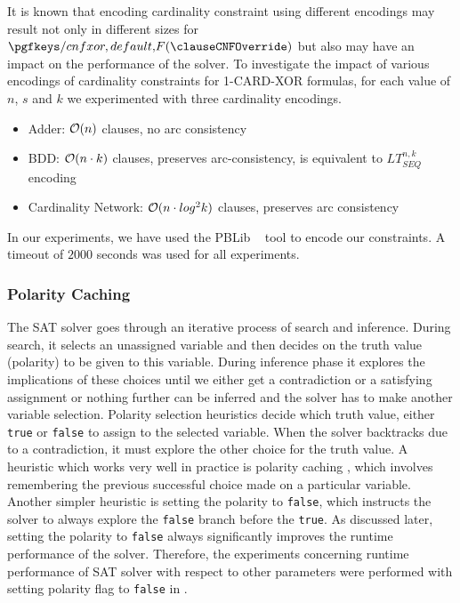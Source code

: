 It is known that encoding cardinality constraint using different encodings may result not only in different sizes for $\F$ but also may have an impact on the performance of the solver.
To investigate the impact of various encodings of cardinality constraints for 1-CARD-XOR formulas, for each value of $n$, $s$ and $k$ we experimented with three cardinality encodings.
  \begin{itemize}[itemsep=1pt]
	\item Adder: $\mathcal{O}(n)$ clauses, no arc consistency ~\cite{ES06}
	\item BDD:   $\mathcal{O}(n\cdot k)$ clauses, preserves arc-consistency, is equivalent to $LT^{n,k}_{SEQ}$ encoding ~\cite{Sinz05} 
	\item Cardinality Network:  $\mathcal{O}(n\cdot log^2 k)$ clauses, preserves arc consistency ~\cite{CardinalityNA09} 
\end{itemize} 
In our experiments, we have used the PBLib ~\cite{pblib} tool to encode our constraints.
A timeout of $2000$ seconds was used for all experiments. 
\subsubsection{Polarity Caching}
The SAT solver goes through an iterative process of search and inference. During search, it selects an unassigned variable and then decides on the truth value (polarity) to be given to this variable.
During inference phase it explores the implications of these choices until we either get a contradiction or a satisfying assignment or nothing further can be inferred and the solver has to  make another variable selection. Polarity selection heuristics decide which truth value, either {\tt true} or {\tt false} to assign to the selected variable. When the solver backtracks due to a contradiction, it must explore  the other choice for the truth value. A heuristic which works very well in practice is polarity caching \cite{DBLP:conf/sat/PipatsrisawatD07}, which involves remembering the previous successful choice made on a particular variable. Another simpler heuristic is setting the polarity to {\tt false}, which instructs the solver to always explore the {\tt false} branch before the {\tt true}. As discussed later, setting the polarity to {\tt false} always significantly improves the runtime performance of the solver. Therefore, the experiments concerning runtime performance of SAT solver with respect to other parameters were performed with setting polarity flag to {\tt false} in \CryptoMiniSAT. 




